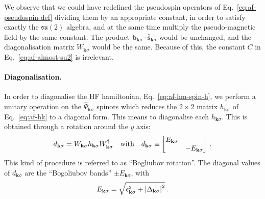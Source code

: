 We observe that we could have redefined the pseudospin operators of Eq.~\eqref{eq:af-pseudospin-def} dividing them by an appropriate constant, in order to satisfy exactly the $\mathfrak{su}(2)$ algebra, and at the same time multiply the pseudo-magnetic field by the same constant. The product $\mathbf{b}_{\mathbf{k}\sigma} \cdot \hat{\mathbf{s}}_{\mathbf{k}\sigma}$ would be unchanged, and the diagonalisation matrix $W_{\mathbf{k}\sigma}$ would be the same. Because of this, the constant $C$ in Eq.~\eqref{eq:af-almost-su2} is irrelevant.

\paragraph{Diagonalisation.}

In order to diagonalise the HF hamiltonian, Eq.~\eqref{eq:af-hm-spin-h}, we perform a unitary operation on the $\hat \Psi_{\mathbf{k}\sigma}$ spinors which reduces the $2 \times 2$ matrix $h_{\mathbf{k}\sigma}$ of Eq.~\eqref{eq:af-hk} to a diagonal form. This means to diagonalise each $h_{\mathbf{k}\sigma}$. This is obtained through a rotation around the $y$ axis:
\begin{equation}\label{eq:af-WhW+-hm}
	d_{\mathbf{k}\sigma} = W_{\mathbf{k}\sigma} h_{\mathbf{k}\sigma} W_{\mathbf{k}\sigma}^\dagger
	\qq{with}
	d_{\mathbf{k}\sigma} \equiv \begin{bmatrix}
		E_{\mathbf{k}\sigma} & \\
		& - E_{\mathbf{k}\sigma}
	\end{bmatrix} \, .
\end{equation}
This kind of procedure is referred to as ``Bogliubov rotation''. The diagonal values of $d_{\mathbf{k}\sigma}$ are the ``Bogoliubov bands'' $\pm E_{\mathbf{k}\sigma}$, with
\begin{equation}\label{eq:af-bands}
	E_{\mathbf{k}\sigma} = \sqrt{
		\epsilon_{\mathbf{k}\sigma}^2 + \abs{\Delta_{\mathbf{k}\sigma}}^2
	} \, .
\end{equation}

